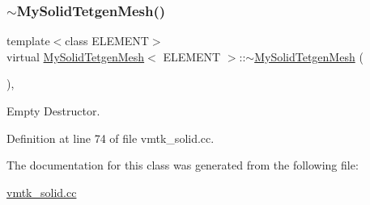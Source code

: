 \subsubsection{\texorpdfstring{$\sim$\+My\+Solid\+Tetgen\+Mesh()}{~MySolidTetgenMesh()}}
{\footnotesize\ttfamily template$<$class E\+L\+E\+M\+E\+NT$>$ \\
virtual \hyperlink{classMySolidTetgenMesh}{My\+Solid\+Tetgen\+Mesh}$<$ E\+L\+E\+M\+E\+NT $>$\+::$\sim$\hyperlink{classMySolidTetgenMesh}{My\+Solid\+Tetgen\+Mesh} (\begin{DoxyParamCaption}{ }\end{DoxyParamCaption})\hspace{0.3cm}{\ttfamily [inline]}, {\ttfamily [virtual]}}



Empty Destructor. 



Definition at line 74 of file vmtk\+\_\+solid.\+cc.



The documentation for this class was generated from the following file\+:\begin{DoxyCompactItemize}
\item 
\hyperlink{vmtk__solid_8cc}{vmtk\+\_\+solid.\+cc}\end{DoxyCompactItemize}
